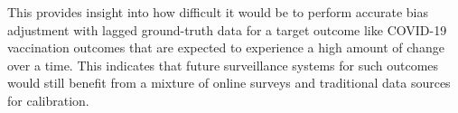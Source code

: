 This provides insight into how difficult it would be to perform accurate bias adjustment with lagged ground-truth data for a target outcome like COVID-19 vaccination outcomes that are expected to experience a high amount of change over a time. This indicates that future surveillance systems for such outcomes would still benefit from a mixture of online surveys and traditional data sources for calibration.